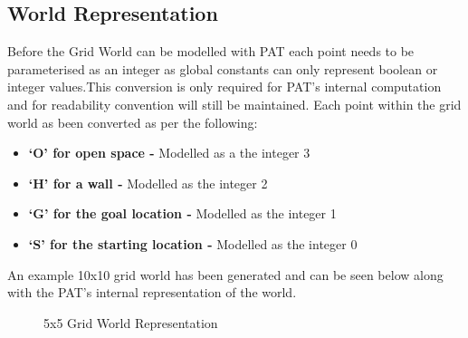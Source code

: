 \documentclass[twoside, 12pt, a4paper]{article}
\begin{document}
\subsection{World Representation}
Before the Grid World can be modelled with PAT each point needs to be parameterised as an integer as global constants can only represent boolean or integer values.This conversion is only required for PAT's internal computation and for readability convention will still be maintained. Each point within the grid world as been converted as per the following:
\begin{itemize}
\item  \textbf{‘O’ for open space -} Modelled as a the integer 3
\item  \textbf{‘H’ for a wall -} Modelled as the integer 2
\item \textbf{‘G’ for the goal location -} Modelled as the integer 1   
\item  \textbf{‘S’ for the starting location - }Modelled as the integer 0
\end {itemize}
An example 10x10 grid world has been generated and can be seen below along with the PAT's internal representation of the world. 
\begin{figure}[ht]%
    \centering
    \qquad
    \caption{5x5 Grid World Representation}%
    \label{fig:example}%
\end{figure}
\end{document}
